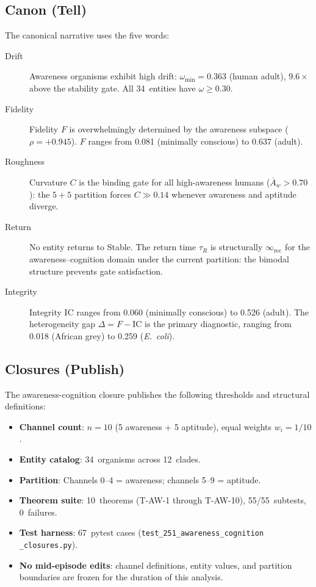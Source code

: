 \documentclass[
  aps,
  prd,
  twocolumn,
  superscriptaddress,
  nofootinbib,
  floatfix
]{revtex4-2}
\newcommand{\IC}{\mathrm{IC}}
\newcommand{\Aw}{\overline{A}_{\!w}}
\begin{document}
\subsection{Canon (Tell)}

The canonical narrative uses the five words:

\begin{description}
\item[Drift] Awareness organisms exhibit high drift:
  $\omega_{\min} = 0.363$ (human adult), $9.6\times$ above
  the stability gate.  All 34~entities have
  $\omega \geq 0.30$.

\item[Fidelity] Fidelity $F$ is overwhelmingly determined
  by the awareness subspace ($\rho = +0.945$).  $F$ ranges
  from 0.081 (minimally conscious) to 0.637 (adult).

\item[Roughness] Curvature $C$ is the binding gate for
  all high-awareness humans ($\Aw > 0.70$): the
  $5\!+\!5$ partition forces $C \gg 0.14$ whenever
  awareness and aptitude diverge.

\item[Return] No entity returns to Stable.  The return
  time $\tau_R$ is structurally $\infty_{\mathrm{rec}}$
  for the awareness--cognition domain under the current
  partition: the bimodal structure prevents gate
  satisfaction.

\item[Integrity] Integrity $\IC$ ranges from 0.060
  (minimally conscious) to 0.526 (adult).  The heterogeneity gap
  $\Delta = F - \IC$ is the primary diagnostic,
  ranging from 0.018 (African grey) to 0.259
  (\textit{E.~coli}).
\end{description}

\subsection{Closures (Publish)}

The awareness-cognition closure publishes the following
thresholds and structural definitions:

\begin{itemize}
\item \textbf{Channel count}: $n = 10$ (5 awareness + 5
  aptitude), equal weights $w_i = 1/10$.
\item \textbf{Entity catalog}: 34~organisms across
  12~clades.
\item \textbf{Partition}: Channels 0--4 = awareness;
  channels 5--9 = aptitude.
\item \textbf{Theorem suite}: 10~theorems (T-AW-1 through
  T-AW-10), 55/55~subtests, 0~failures.
\item \textbf{Test harness}: 67~pytest cases
  (\texttt{test\_251\_awareness\_cognition\allowbreak
  \_closures.py}).
\item \textbf{No mid-episode edits}: channel definitions,
  entity values, and partition boundaries are frozen for
  the duration of this analysis.
\end{itemize}
\end{document}
